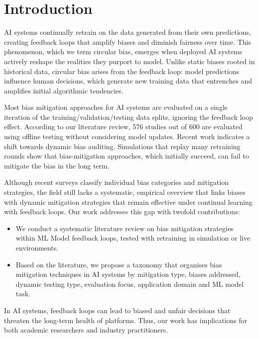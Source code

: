\documentclass[11pt]{article}
\begin{document}
\newpage

\section{Introduction}

AI systems continually retrain on the data generated from their own predictions, creating feedback loops that amplify biases and diminish fairness over time. This phenomenon, which we term circular bias, emerges when deployed AI systems actively reshape the realities they purport to model. Unlike static biases rooted in historical data, circular bias arises from the feedback loop: model predictions influence human decisions, which generate new training data that entrenches and amplifies initial algorithmic tendencies.

Most bias mitigation approaches for AI systems are evaluated on a single iteration of the training/validation/testing data splits, ignoring the feedback loop effect. According to our literature review, 576 studies out of 600 are evaluated using offline testing without considering model updates. Recent work indicates a shift towards dynamic bias auditing. Simulations that replay many retraining rounds show that bias-mitigation approaches, which initially succeed, can fail to mitigate the bias in the long term.

Although recent surveys classify individual bias categories and mitigation strategies, the field still lacks a systematic, empirical overview that links biases with dynamic mitigation strategies that remain effective under continual learning with feedback loops. Our work addresses this gap with twofold contributions:

\begin{itemize}
    \item We conduct a systematic literature review on bias mitigation strategies within ML Model feedback loops, tested with retraining in simulation or live environments.
    \item Based on the literature, we propose a taxonomy that organises bias mitigation techniques in AI systems by mitigation type, biases addressed, dynamic testing type, evaluation focus, application domain and ML model task.
\end{itemize}

In AI systems, feedback loops can lead to biased and unfair decisions that threaten the long-term health of platforms. Thus, our work has implications for both academic researchers and industry practitioners.
\end{document}
